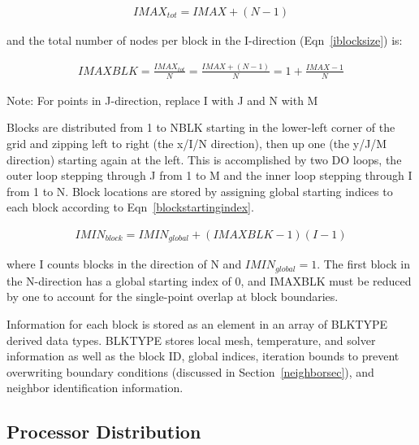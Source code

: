 \documentclass[twocolumn,10pt]{asme2ej}
\begin{document}
\vspace{-1em}
\begin{equation}
\begin{split}
IMAX_{tot} = IMAX + (N-1)
\end{split}
\label{idirpoints}
\end{equation}
\vspace{-1em}

\noindent and the total number of nodes per block in the I-direction (Eqn~\ref{iblocksize}) is:

\vspace{-1em}
\begin{equation}
\begin{split}
IMAXBLK = \frac{IMAX_{tot}}{N} = \frac{IMAX + (N-1)}{N} = 1 + \frac{IMAX-1}{N}
\end{split}
\label{iblocksize}
\end{equation}

\noindent Note: For points in J-direction, replace I with J and N with M

Blocks are distributed from 1 to NBLK starting in the lower-left corner of the grid and zipping left to right (the x/I/N direction), then up one (the y/J/M direction) starting again at the left.  This is accomplished by two DO loops, the outer loop stepping through J from 1 to M and the inner loop stepping through I from 1 to N. Block locations are stored by assigning global starting indices to each block according to Eqn~\ref{blockstartingindex}.

\begin{equation}
\begin{split}
IMIN_{block} = IMIN_{global} + (IMAXBLK-1)(I-1)
\end{split}
\label{blockstartingindex}
\end{equation}

\noindent where I counts blocks in the direction of N and $IMIN_{global}=1$.  The first block in the N-direction has a global starting index of 0, and IMAXBLK must be reduced by one to account for the single-point overlap at block boundaries.

Information for each block is stored as an element in an array of BLKTYPE derived data types.  BLKTYPE stores local mesh, temperature, and solver information as well as the block ID, global  indices, iteration bounds to prevent overwriting boundary conditions (discussed in Section~\ref{neighborsec}), and neighbor identification information.

\subsection{Processor Distribution}
\end{document}
